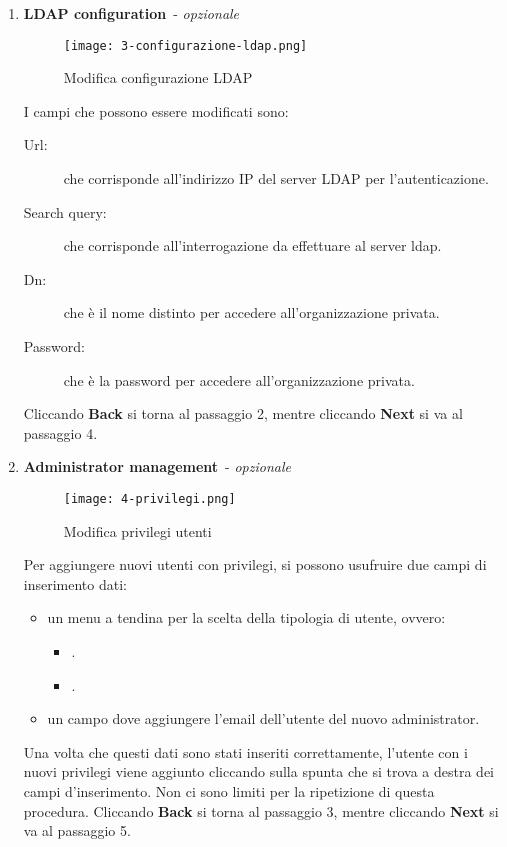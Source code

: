 \documentclass[../manuale-utente.tex]{subfiles}
\begin{document}
\begin{enumerate}
    \item \textbf{LDAP configuration}~- \textit{opzionale}

    \begin{figure}[H]
        \centering
        \texttt{[image: 3-configurazione-ldap.png]}
        \caption{Modifica configurazione LDAP}%
        \label{fig:web_app_modifica_configurazione_ldap}
    \end{figure}
    I campi che possono essere modificati sono:
    \begin{description}
      \item[Url:] che corrisponde all'indirizzo IP del server LDAP per l'autenticazione.
      \item[Search query:]  che corrisponde all'interrogazione da effettuare al server ldap.
      \item[Dn:] che è il nome distinto per accedere all'organizzazione privata.
      \item[Password:] che è la password per accedere all'organizzazione privata.
  \end{description}
    Cliccando \textbf{Back} si torna al passaggio 2, mentre cliccando \textbf{Next} si va al passaggio 4.

    \item \textbf{Administrator management}~- \textit{opzionale}

    \begin{figure}[H]
        \centering
        \texttt{[image: 4-privilegi.png]}
        \caption{Modifica privilegi utenti}%
        \label{fig:web_app_modifica_privilegi_utenti}
    \end{figure}
    Per aggiungere nuovi utenti con privilegi, si possono usufruire due campi di inserimento dati:
    \begin{itemize}
        \item un menu a tendina per la scelta della tipologia di utente, ovvero:
        \begin{itemize}
            \item {}.
            \item {}.
        \end{itemize}
        \item un campo dove aggiungere l'email dell'utente del nuovo administrator.
    \end{itemize}
    Una volta che questi dati sono stati inseriti correttamente, l'utente con i nuovi privilegi viene aggiunto cliccando sulla spunta che si trova a destra dei campi d'inserimento.
    Non ci sono limiti per la ripetizione di questa procedura.
    Cliccando \textbf{Back} si torna al passaggio 3, mentre cliccando \textbf{Next} si va al passaggio 5.


\end{enumerate}
\end{document}
